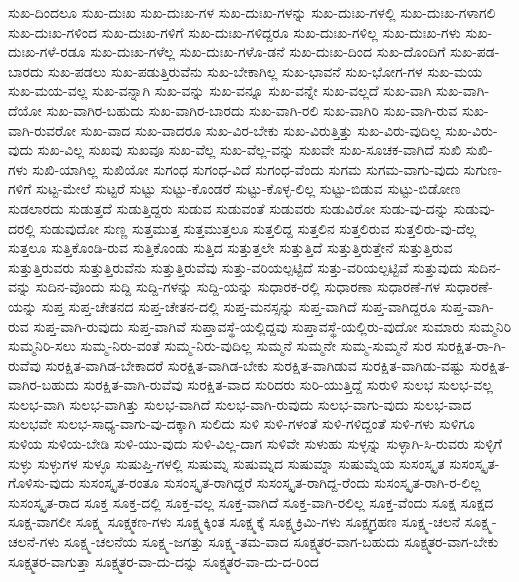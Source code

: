 {ಸುಖ-ದಿಂದಲೂ
ಸುಖ-ದುಃಖ
ಸುಖ-ದುಃಖ-ಗಳ
ಸುಖ-ದುಃಖ-ಗಳನ್ನು
ಸುಖ-ದುಃಖ-ಗಳಲ್ಲಿ
ಸುಖ-ದುಃಖ-ಗಳಾಗಲಿ
ಸುಖ-ದುಃಖ-ಗಳಿಂದ
ಸುಖ-ದುಃಖ-ಗಳಿಗೆ
ಸುಖ-ದುಃಖ-ಗಳಿದ್ದರೂ
ಸುಖ-ದುಃಖ-ಗಳಿಲ್ಲ
ಸುಖ-ದುಃಖ-ಗಳು
ಸುಖ-ದುಃಖ-ಗಳೆ-ರಡೂ
ಸುಖ-ದುಃಖ-ಗಳೆಲ್ಲ
ಸುಖ-ದುಃಖ-ಗಳೊ-ಡನೆ
ಸುಖ-ದುಃಖ-ದಿಂದ
ಸುಖ-ದೊಂದಿಗೆ
ಸುಖ-ಪಡ-ಬಾರದು
ಸುಖ-ಪಡಲು
ಸುಖ-ಪಡುತ್ತಿರುವೆನು
ಸುಖ-ಬೇಕಾಗಿಲ್ಲ
ಸುಖ-ಭಾವನೆ
ಸುಖ-ಭೋಗ-ಗಳ
ಸುಖ-ಮಯ
ಸುಖ-ಮಯ-ವಲ್ಲ
ಸುಖ-ವನ್ನಾಗಿ
ಸುಖ-ವನ್ನು
ಸುಖ-ವನ್ನೂ
ಸುಖ-ವನ್ನೇ
ಸುಖ-ವಲ್ಲದೆ
ಸುಖ-ವಾಗಿ
ಸುಖ-ವಾಗಿ-ದೆಯೋ
ಸುಖ-ವಾಗಿರ-ಬಹುದು
ಸುಖ-ವಾಗಿರ-ಬಾರದು
ಸುಖ-ವಾಗಿ-ರಲಿ
ಸುಖ-ವಾಗಿರಿ
ಸುಖ-ವಾಗಿ-ರುವ
ಸುಖ-ವಾಗಿ-ರುವರೋ
ಸುಖ-ವಾದ
ಸುಖ-ವಾದರೂ
ಸುಖ-ವಿರ-ಬೇಕು
ಸುಖ-ವಿರುತ್ತಿತ್ತು
ಸುಖ-ವಿರು-ವುದಿಲ್ಲ
ಸುಖ-ವಿರು-ವುದು
ಸುಖ-ವಿಲ್ಲ
ಸುಖವು
ಸುಖವೂ
ಸುಖ-ವೆಲ್ಲ
ಸುಖ-ವೆಲ್ಲ-ವನ್ನು
ಸುಖವೇ
ಸುಖ-ಸೂಚಕ-ವಾಗಿದೆ
ಸುಖಿ
ಸುಖಿ-ಗಳು
ಸುಖಿ-ಯಾಗಿಲ್ಲ
ಸುಖಿಯೋ
ಸುಗಂಧ
ಸುಗಂಧ-ವಿದೆ
ಸುಗಂಧ-ವೆಂದು
ಸುಗಮ
ಸುಗಮ-ವಾಗು-ವುದು
ಸುಗುಣ-ಗಳಿಗೆ
ಸುಟ್ಟ-ಮೇಲೆ
ಸುಟ್ಟರೆ
ಸುಟ್ಟು
ಸುಟ್ಟು-ಕೊಂಡರೆ
ಸುಟ್ಟು-ಕೊಳ್ಳ-ಲಿಲ್ಲ
ಸುಟ್ಟು-ಬಿಡುವ
ಸುಟ್ಟು-ಬಿಡೋಣ
ಸುಡಲಾರದು
ಸುಡುತ್ತದೆ
ಸುಡುತ್ತಿದ್ದರು
ಸುಡುವ
ಸುಡುವಂತೆ
ಸುಡುವರು
ಸುಡುವಿರೋ
ಸುಡು-ವು-ದನ್ನು
ಸುಡುವು-ದರಲ್ಲಿ
ಸುಡುವುದೋ
ಸುಣ್ಣ
ಸುತ್ತಮುತ್ತ
ಸುತ್ತಮುತ್ತಲೂ
ಸುತ್ತಲಿದ್ದ
ಸುತ್ತಲಿನ
ಸುತ್ತಲಿರುವ
ಸುತ್ತಲಿರು-ವು-ದೆಲ್ಲ
ಸುತ್ತಲೂ
ಸುತ್ತಿಕೊಂಡಿ-ರುವ
ಸುತ್ತಿಕೊಂಡು
ಸುತ್ತಿದ
ಸುತ್ತುತ್ತಲೇ
ಸುತ್ತುತ್ತಿದೆ
ಸುತ್ತುತ್ತಿರುತ್ತೇನೆ
ಸುತ್ತುತ್ತಿರುವ
ಸುತ್ತುತ್ತಿರುವರು
ಸುತ್ತುತ್ತಿರುವೆನು
ಸುತ್ತುತ್ತಿರುವೆವು
ಸುತ್ತು-ವರಿಯಲ್ಪಟ್ಟಿದೆ
ಸುತ್ತು-ವರಿಯಲ್ಪಟ್ಟಿವೆ
ಸುತ್ತುವುದು
ಸುದಿನ-ವನ್ನು
ಸುದಿನ-ವೊಂದು
ಸುದ್ದಿ
ಸುದ್ದಿ-ಗಳನ್ನು
ಸುದ್ದಿ-ಯನ್ನು
ಸುಧಾರಕ-ರಲ್ಲಿ
ಸುಧಾರಣಾ
ಸುಧಾರಣೆ-ಗಳ
ಸುಧಾರಣೆ-ಯನ್ನು
ಸುಪ್ತ
ಸುಪ್ತ-ಚೇತನದ
ಸುಪ್ತ-ಚೇತನ-ದಲ್ಲಿ
ಸುಪ್ತ-ಮನಸ್ಸನ್ನು
ಸುಪ್ತ-ವಾಗಿದೆ
ಸುಪ್ತ-ವಾಗಿದ್ದರೂ
ಸುಪ್ತ-ವಾಗಿ-ರುವ
ಸುಪ್ತ-ವಾಗಿ-ರುವುದು
ಸುಪ್ತ-ವಾಗಿವೆ
ಸುಪ್ತಾವಸ್ಥೆ-ಯಲ್ಲಿದ್ದವು
ಸುಪ್ತಾವಸ್ಥೆ-ಯಲ್ಲಿರು-ವುದೋ
ಸುಮಾರು
ಸುಮ್ಮನಿರಿ
ಸುಮ್ಮನಿರಿ-ಸಲು
ಸುಮ್ಮ-ನಿರು-ವಂತೆ
ಸುಮ್ಮ-ನಿರು-ವುದಿಲ್ಲ
ಸುಮ್ಮನೆ
ಸುಮ್ಮನೇ
ಸುಮ್ಮ-ಸುಮ್ಮನೆ
ಸುರ
ಸುರಕ್ಷಿತ-ರಾ-ಗಿ-ರುವೆವು
ಸುರಕ್ಷಿತ-ವಾಗಿಡ-ಬೇಕಾದರೆ
ಸುರಕ್ಷಿತ-ವಾಗಿಡ-ಬೇಕು
ಸುರಕ್ಷಿತ-ವಾಗಿಡುವ
ಸುರಕ್ಷಿತ-ವಾಗಿಡು-ವಷ್ಟು
ಸುರಕ್ಷಿತ-ವಾಗಿರ-ಬಹುದು
ಸುರಕ್ಷಿತ-ವಾಗಿ-ರುವೆವು
ಸುರಕ್ಷಿತ-ವಾದ
ಸುರಿದರು
ಸುರಿ-ಯುತ್ತಿದ್ದೆ
ಸುರುಳಿ
ಸುಲಭ
ಸುಲಭ-ವಲ್ಲ
ಸುಲಭ-ವಾಗಿ
ಸುಲಭ-ವಾಗಿತ್ತು
ಸುಲಭ-ವಾಗಿದೆ
ಸುಲಭ-ವಾಗಿ-ರುವುದು
ಸುಲಭ-ವಾಗು-ವುದು
ಸುಲಭ-ವಾದ
ಸುಲಭವೇ
ಸುಲಭ-ಸಾಧ್ಯ-ವಾಗು-ವು-ದಕ್ಕಾಗಿ
ಸುಲಿದು
ಸುಳಿ
ಸುಳಿ-ಗಳಂತೆ
ಸುಳಿ-ಗಳಿದ್ದಂತೆ
ಸುಳಿ-ಗಳು
ಸುಳಿಗೂ
ಸುಳಿಯ
ಸುಳಿಯ-ಬೇಡಿ
ಸುಳಿ-ಯು-ವುದು
ಸುಳಿ-ವಿಲ್ಲ-ದಾಗ
ಸುಳಿವೇ
ಸುಳುಹು
ಸುಳ್ಳನ್ನು
ಸುಳ್ಳಾಗಿ-ಸಿ-ರುವರು
ಸುಳ್ಳಿಗೆ
ಸುಳ್ಳು
ಸುಳ್ಳುಗಳ
ಸುಳ್ಳೂ
ಸುಷುಪ್ತಿ-ಗಳಲ್ಲಿ
ಸುಷುಮ್ನ
ಸುಷುಮ್ನದ
ಸುಷುಮ್ನಾ
ಸುಷುಮ್ನೆಯ
ಸುಸಂಸ್ಕೃತ
ಸುಸಂಸ್ಕೃತ-ಗೊಳಿಸು-ವುದು
ಸುಸಂಸ್ಕೃತ-ರಂತೂ
ಸುಸಂಸ್ಕೃತ-ರಾಗಿದ್ದರೆ
ಸುಸಂಸ್ಕೃತ-ರಾಗಿದ್ದ-ರೆಂದು
ಸುಸಂಸ್ಕೃತ-ರಾಗಿ-ರ-ಲಿಲ್ಲ
ಸುಸಂಸ್ಕೃತ-ರಾದ
ಸೂಕ್ತ
ಸೂಕ್ತ-ದಲ್ಲಿ
ಸೂಕ್ತ-ವಲ್ಲ
ಸೂಕ್ತ-ವಾಗಿದೆ
ಸೂಕ್ತ-ವಾಗಿ-ರಲಿಲ್ಲ
ಸೂಕ್ತ-ವೆಂದು
ಸೂಕ್ಷ
ಸೂಕ್ಷದ
ಸೂಕ್ಷ-ವಾಗಲೀ
ಸೂಕ್ಷ್ಮ
ಸೂಕ್ಷ್ಮಕಣ-ಗಳು
ಸೂಕ್ಷ್ಮಕ್ಕಿಂತ
ಸೂಕ್ಷ್ಮಕ್ಕೆ
ಸೂಕ್ಷ್ಮಕ್ರಿಮಿ-ಗಳು
ಸೂಕ್ಷ್ಮಗ್ರಹಣ
ಸೂಕ್ಷ್ಮ-ಚಲನೆ
ಸೂಕ್ಷ್ಮ-ಚಲನೆ-ಗಳು
ಸೂಕ್ಷ್ಮ-ಚಲನೆಯ
ಸೂಕ್ಷ್ಮ-ಜಗತ್ತು
ಸೂಕ್ಷ್ಮ-ತಮ-ವಾದ
ಸೂಕ್ಷ್ಮತರ-ವಾಗ-ಬಹುದು
ಸೂಕ್ಷ್ಮತರ-ವಾಗ-ಬೇಕು
ಸೂಕ್ಷ್ಮತರ-ವಾಗುತ್ತಾ
ಸೂಕ್ಷ್ಮತರ-ವಾ-ದು-ದನ್ನು
ಸೂಕ್ಷ್ಮತರ-ವಾ-ದು-ದ-ರಿಂದ
}
